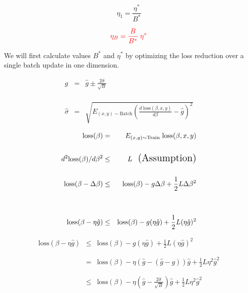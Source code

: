 {\vfill
$$\eta_1 = \frac{\eta^*}{B^*}$$

\vfill
$${\color{red} \eta_B = \frac{B}{B^*} \;\eta^*}$$


We will first calculate values $B^*$ and $\eta^*$ by optimizing the loss reduction over a single batch update in one dimension.

\vfill
\begin{eqnarray*}
  g & = & \hat{g} \pm \frac{2\hat{\sigma}}{\sqrt{B}} \\
  \\
  \\
  \\
  \hat{\sigma} & = & \sqrt{E_{(x,y) \sim \mathrm{Batch}} \left(\frac{d\;\mathrm{loss}(\beta,x,y)}{d \beta} - \hat{g}\right)^2}
\end{eqnarray*}


\begin{eqnarray*}
  \mathrm{loss}(\beta) & = & E_{(x,y) \sim \mathrm{Train}}\;\mathrm{loss}(\beta,x,y) \\
  \\
  d^2 \mathrm{loss}(\beta)/d \beta^2 & \leq & L \;\;\;\mbox{\Large (Assumption)} \\
  \\
  \mathrm{loss}(\beta - \Delta\beta) & \leq & \mathrm{loss}(\beta) - g\Delta \beta + \frac{1}{2}L\Delta \beta^2 \\
  \\
  \\
  \mathrm{loss}(\beta - \eta\hat{g}) & \leq & \mathrm{loss}(\beta) - g(\eta\hat{g}) + \frac{1}{2}L(\eta\hat{g})^2
\end{eqnarray*}


\begin{eqnarray*}
  \mathrm{loss}(\beta - \eta\hat{g}) & \leq & \mathrm{loss}(\beta) - g(\eta\hat{g}) + \frac{1}{2}L(\eta\hat{g})^2 \\
  \\
  \\
  & = &  \mathrm{loss}(\beta) - \eta (\hat{g} - (\hat{g} -g)) \hat{g} + \frac{1}{2}L\eta^2 \hat{g}^2 \\
  \\
  \\
  & \leq &  \mathrm{loss}(\beta) - \eta \left(\hat{g} - \frac{2\hat{\sigma}}{\sqrt{B}}\right)\hat{g} + \frac{1}{2}L \eta^2 \hat{g}^2
\end{eqnarray*}

}

